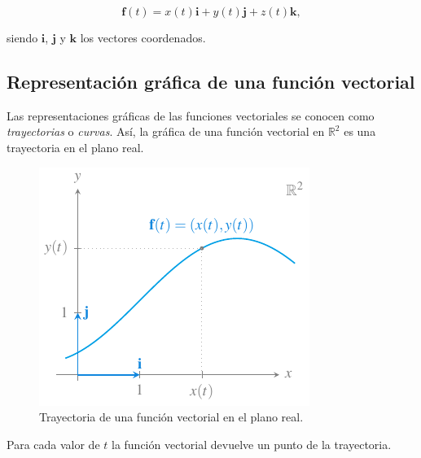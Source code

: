 \documentclass[
  a4paper,
]{scrreport}
\theoremstyle{definition}
\theoremstyle{plain}
\theoremstyle{definition}
\theoremstyle{definition}
\theoremstyle{plain}
\theoremstyle{plain}
\theoremstyle{remark}
\begin{document}
\[
\mathbf{f}(t) = x(t)\mathbf{i}+y(t)\mathbf{j}+z(t)\mathbf{k},
\]

siendo \(\mathbf{i}\), \(\mathbf{j}\) y \(\mathbf{k}\) los vectores
coordenados.

\subsection{Representación gráfica de una función
vectorial}\label{representaciuxf3n-gruxe1fica-de-una-funciuxf3n-vectorial}

Las representaciones gráficas de las funciones vectoriales se conocen
como \emph{trayectorias} o \emph{curvas}. Así, la gráfica de una función
vectorial en \(\mathbb{R}^2\) es una trayectoria en el plano real.

\begin{figure}[H]

{\centering \includegraphics{img/funciones-vectoriales/trayectoria-plano.pdf}

}

\caption{Trayectoria de una función vectorial en el plano real.}

\end{figure}%

Para cada valor de \(t\) la función vectorial devuelve un punto de la
trayectoria.
\end{document}
